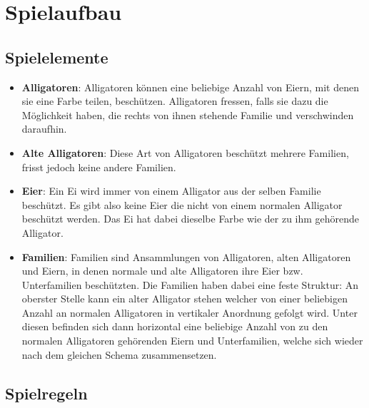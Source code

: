 \chapter{Spielaufbau}

\section{Spielelemente}
	
	\begin{itemize}
	
	\item \textbf{Alligatoren}: Alligatoren können eine beliebige Anzahl von Eiern, mit denen sie eine Farbe teilen, beschützen. Alligatoren fressen, falls sie dazu die Möglichkeit haben, die rechts von ihnen stehende Familie und verschwinden daraufhin.
	
	\item \textbf{Alte Alligatoren}: Diese Art von Alligatoren beschützt mehrere Familien, frisst jedoch keine andere Familien.
	
	\item \textbf{Eier}: Ein Ei wird immer von einem Alligator aus der selben Familie beschützt.  Es gibt also keine Eier die nicht von einem normalen Alligator beschützt werden. Das Ei hat dabei dieselbe Farbe wie der zu ihm gehörende Alligator.
	
	\item \textbf{Familien}: Familien sind Ansammlungen von Alligatoren, alten Alligatoren und Eiern, in denen normale und alte Alligatoren ihre Eier bzw. Unterfamilien beschützten. Die Familien haben dabei eine feste Struktur: An oberster Stelle kann ein alter Alligator stehen welcher von einer beliebigen Anzahl an normalen Alligatoren in vertikaler Anordnung gefolgt wird. Unter diesen befinden sich dann horizontal eine beliebige Anzahl von zu den normalen Alligatoren gehörenden Eiern und Unterfamilien, welche sich wieder nach dem gleichen Schema zusammensetzen.
	
	\end{itemize}	
	
\section{Spielregeln}
	
